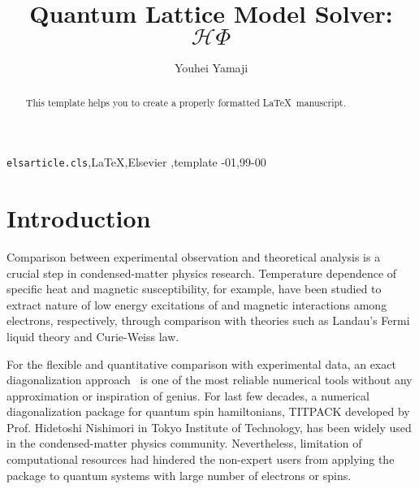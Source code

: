\documentclass[review]{elsarticle}
\begin{document}
\begin{frontmatter}

\title{Quantum Lattice Model Solver: $\mathcal{H} \Phi$}

\author{Youhei Yamaji}
\address{Quantum-Phase Electronics Center (QPEC), The University of Tokyo, Bunkyo-ku, Tokyo, 113-8656, Japan}




\begin{abstract}
This template helps you to create a properly formatted \LaTeX\ manuscript.
\end{abstract}

\begin{keyword}
\texttt{elsarticle.cls}\sep \LaTeX\sep Elsevier \sep template
-01\sep  99-00
\end{keyword}

\end{frontmatter}

\linenumbers

\newcommand{\HPhi}{ \mathcal{H} \Phi}
\section{Introduction}

Comparison between experimental observation and theoretical analysis is a crucial step
in condensed-matter physics research. Temperature dependence of specific heat and
magnetic susceptibility, for example, have been studied to extract nature of low energy
excitations of and magnetic interactions among electrons, respectively, through comparison
with theories such as Landau's Fermi liquid theory and Curie-Weiss law.

For the flexible and quantitative comparison with experimental data, an exact diagonalization
approach~\cite{Dagotto} is one of the most reliable numerical tools without any approximation or
inspiration of genius. For last few decades, a numerical diagonalization package for quantum
spin hamiltonians, TITPACK developed by Prof. Hidetoshi Nishimori in Tokyo Institute of Technology,
has been widely used in the condensed-matter physics community. Nevertheless, limitation of
computational resources had hindered the non-expert users from applying the package to
quantum systems with large number of electrons or spins.
\end{document}
